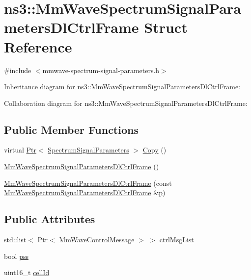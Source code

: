 \hypertarget{structns3_1_1MmWaveSpectrumSignalParametersDlCtrlFrame}{}\section{ns3\+:\+:Mm\+Wave\+Spectrum\+Signal\+Parameters\+Dl\+Ctrl\+Frame Struct Reference}
\label{structns3_1_1MmWaveSpectrumSignalParametersDlCtrlFrame}


{\ttfamily \#include $<$mmwave-\/spectrum-\/signal-\/parameters.\+h$>$}



Inheritance diagram for ns3\+:\+:Mm\+Wave\+Spectrum\+Signal\+Parameters\+Dl\+Ctrl\+Frame\+:


Collaboration diagram for ns3\+:\+:Mm\+Wave\+Spectrum\+Signal\+Parameters\+Dl\+Ctrl\+Frame\+:
\subsection*{Public Member Functions}
\begin{DoxyCompactItemize}
\item 
virtual \hyperlink{classns3_1_1Ptr}{Ptr}$<$ \hyperlink{structns3_1_1SpectrumSignalParameters}{Spectrum\+Signal\+Parameters} $>$ \hyperlink{structns3_1_1MmWaveSpectrumSignalParametersDlCtrlFrame_ac254fd0e4da879c515913a025300d583}{Copy} ()
\item 
\hyperlink{structns3_1_1MmWaveSpectrumSignalParametersDlCtrlFrame_a0c6a840727869fe8689faa0a850322f8}{Mm\+Wave\+Spectrum\+Signal\+Parameters\+Dl\+Ctrl\+Frame} ()
\item 
\hyperlink{structns3_1_1MmWaveSpectrumSignalParametersDlCtrlFrame_a07c4c56b81c74f4568e8b5bbd5055e59}{Mm\+Wave\+Spectrum\+Signal\+Parameters\+Dl\+Ctrl\+Frame} (const \hyperlink{structns3_1_1MmWaveSpectrumSignalParametersDlCtrlFrame}{Mm\+Wave\+Spectrum\+Signal\+Parameters\+Dl\+Ctrl\+Frame} \&\hyperlink{lte__link__budget__x2__handover__measures_8m_ac9de518908a968428863f829398a4e62}{p})
\end{DoxyCompactItemize}
\subsection*{Public Attributes}
\begin{DoxyCompactItemize}
\item 
\hyperlink{openflow-interface_8h_afd9bcfa176617760671b67580f536fa7}{std\+::list}$<$ \hyperlink{classns3_1_1Ptr}{Ptr}$<$ \hyperlink{classns3_1_1MmWaveControlMessage}{Mm\+Wave\+Control\+Message} $>$ $>$ \hyperlink{structns3_1_1MmWaveSpectrumSignalParametersDlCtrlFrame_a72bb3769769db04039d2d6c1c1678981}{ctrl\+Msg\+List}
\item 
bool \hyperlink{structns3_1_1MmWaveSpectrumSignalParametersDlCtrlFrame_aa872e6e319b00f95c2d5add1b5576bf2}{pss}
\item 
uint16\+\_\+t \hyperlink{structns3_1_1MmWaveSpectrumSignalParametersDlCtrlFrame_a565935ef9bab70d515ac59dc44040e61}{cell\+Id}
\end{DoxyCompactItemize}
